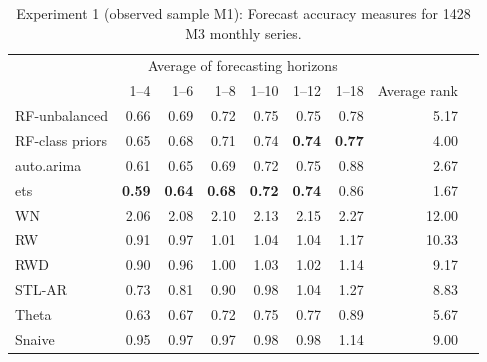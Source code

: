 \documentclass[11pt,a4paper,]{article}
\theoremstyle{definition}
\theoremstyle{definition}
\theoremstyle{definition}
\theoremstyle{remark}
\begin{document}
\begin{table}[!h]
\centering\small
\caption{Experiment 1 (observed sample M1): Forecast accuracy measures for 1428 M3 monthly series.}
\label{M3M}
\begin{tabular}{lrrrrrrrr}
\toprule
 & \multicolumn{6}{c}{Average of forecasting horizons}    &  \\ 
                & 1--4      & 1--6      & 1--8      & 1--10     & 1--12     & 1--18     & Average rank  \\
\midrule
RF-unbalanced   & 0.66      & 0.69      & 0.72      & 0.75      & 0.75      & 0.78      & 5.17  \\
RF-class priors & 0.65      & 0.68      & 0.71      & 0.74      & \bf{0.74} & \bf{0.77} & 4.00  \\ auto.arima & 0.61 & 0.65 & 0.69 & 0.72 & 0.75 & 0.88 & 2.67   \\
ets             & \bf{0.59} & \bf{0.64} & \bf{0.68} & \bf{0.72} & \bf{0.74} & 0.86      & 1.67   \\
WN              & 2.06      & 2.08      & 2.10      & 2.13      & 2.15      & 2.27      & 12.00   \\
RW              & 0.91      & 0.97      & 1.01      & 1.04      & 1.04      & 1.17      & 10.33  \\
RWD             & 0.90      & 0.96      & 1.00      & 1.03      & 1.02      & 1.14      & 9.17  \\
STL-AR          & 0.73      & 0.81      & 0.90      & 0.98      & 1.04      & 1.27      & 8.83  \\
Theta           & 0.63      & 0.67      & 0.72      & 0.75      & 0.77      & 0.89      & 5.67    \\
Snaive          & 0.95      & 0.97      & 0.97      & 0.98      & 0.98      & 1.14      & 9.00  \\
\bottomrule
\end{tabular}
\end{table}
\end{document}
